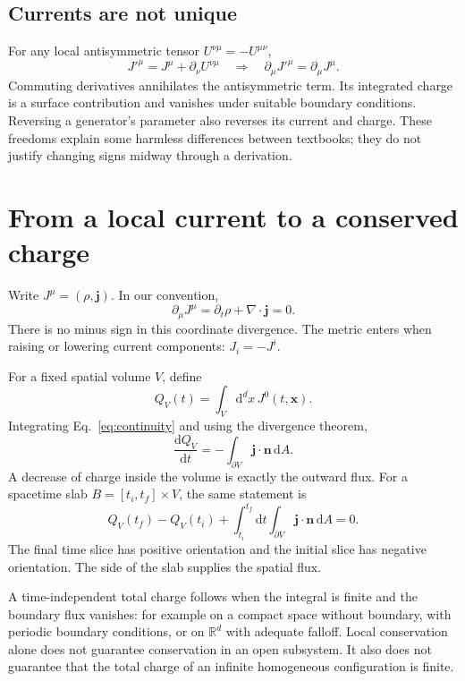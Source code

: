 \documentclass[11pt]{article}
\newcommand{\dd}{\mathrm{d}}
\newcommand{\R}{\mathbb{R}}
\begin{document}
\subsection{Currents are not unique}
For any local antisymmetric tensor \(U^{\nu\mu}=-U^{\mu\nu}\),
\begin{equation}
J'^\mu=J^\mu+\partial_\nu U^{\nu\mu}
\quad\Longrightarrow\quad
\partial_\mu J'^\mu=\partial_\mu J^\mu.
\label{eq:improvement}
\end{equation}
Commuting derivatives annihilates the antisymmetric term. Its integrated
charge is a surface contribution and vanishes under suitable boundary
conditions. Reversing a generator's parameter also reverses its current
and charge. These freedoms explain some harmless differences between
textbooks; they do not justify changing signs midway through a derivation.

\section{From a local current to a conserved charge}

Write \(J^\mu=(\rho,\bm j)\). In our convention,
\begin{equation}
\boxed{\partial_\mu J^\mu=\partial_t\rho+\nabla\cdot\bm j=0.}
\label{eq:continuity}
\end{equation}
There is no minus sign in this coordinate divergence. The metric enters
when raising or lowering current components: \(J_i=-J^i\).

For a fixed spatial volume \(V\), define
\begin{equation}
Q_V(t)=\int_V\dd^d x\,J^0(t,\bm x).
\end{equation}
Integrating Eq.~\eqref{eq:continuity} and using the divergence theorem,
\begin{equation}
\boxed{\frac{\dd Q_V}{\dd t}
=-\int_{\partial V}\bm j\cdot\bm n\,\dd A.}
\label{eq:chargeFlux}
\end{equation}
A decrease of charge inside the volume is exactly the outward flux.
For a spacetime slab \(B=[t_i,t_f]\times V\), the same statement is
\begin{equation}
Q_V(t_f)-Q_V(t_i)
+\int_{t_i}^{t_f}\dd t\int_{\partial V}\bm j\cdot\bm n\,\dd A=0.
\end{equation}
The final time slice has positive orientation and the initial slice has
negative orientation. The side of the slab supplies the spatial flux.

A time-independent total charge follows when the integral is finite and
the boundary flux vanishes: for example on a compact space without
boundary, with periodic boundary conditions, or on \(\R^d\) with adequate
falloff. Local conservation alone does not guarantee conservation in an
open subsystem. It also does not guarantee that the total charge of an
infinite homogeneous configuration is finite.
\end{document}
